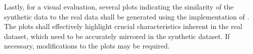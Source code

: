 Lastly, for a visual evaluation, several plots indicating the similarity of the synthetic data to the real data shall be generated using the implementation of \textcite{brenninkmeijer2019GenerationEvaluationTabular}.
The plots shall effectively highlight crucial characteristics inherent in the real dataset, which need to be accurately mirrored in the synthetic dataset.
If necessary, modifications to the plots may be required.

